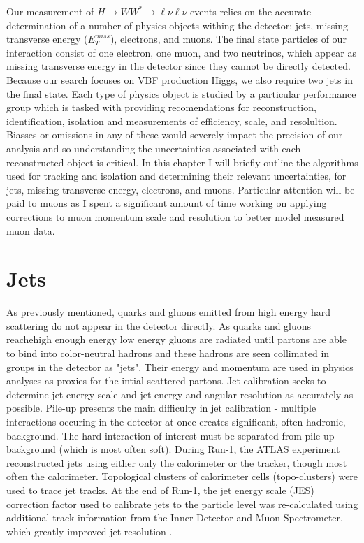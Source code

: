 Our measurement of $H\rightarrow WW^*\rightarrow \ell\nu\ell\nu$ events relies on the accurate determination of a number of physics objects withing the detector: jets, missing transverse energy ($E_T^{miss}$), electrons, and muons. The final state particles of our interaction consist of one electron, one muon, and two neutrinos, which appear as missing transverse energy in the detector since they cannot be directly detected. Because our search focuses on VBF production Higgs, we also require two jets in the final state. Each type of physics object is studied by a particular performance group which is tasked with providing recomendations for reconstruction, identification, isolation and measurements of efficiency, scale, and resolultion. Biasses or omissions in any of these would severely impact the precision of our analysis and so understanding the uncertainties associated with each reconstructed object is critical. In this chapter I will briefly outline the algorithms used for tracking and isolation and determining their relevant uncertainties, for jets, missing transverse energy, electrons, and muons. Particular attention will be paid to muons as I spent a significant amount of time working on applying corrections to muon momentum scale and resolution to better model measured muon data. 
\section{Jets}
As previously mentioned, quarks and gluons emitted from high energy hard scattering do not appear in the detector directly. As quarks and gluons reachehigh enough energy low energy gluons are radiated until partons are able to bind into color-neutral hadrons and these hadrons are seen collimated in groups in the detector as "jets". Their energy and momentum are used in physics analyses as proxies for the intial scattered partons. Jet calibration seeks to determine jet energy scale and jet energy and angular resolution as accurately as possible. Pile-up presents the main difficulty in jet calibration - multiple interactions occuring in the detector at once creates significant, often hadronic, background. The hard interaction of interest must be separated from pile-up background (which is most often soft). During Run-1, the ATLAS experiment reconstructed jets using either only the calorimeter or the tracker, though most often the calorimeter. Topological clusters of calorimeter cells (topo-clusters) were used to trace jet tracks. At the end of Run-1, the jet energy scale (JES) correction factor used to calibrate jets to the particle level was re-calculated using additional track information from the Inner Detector and Muon Spectrometer, which greatly improved jet resolution \cite{JetRun1}. 

